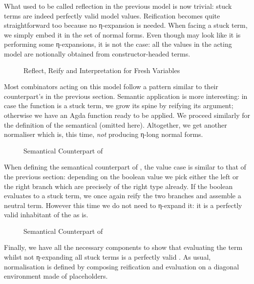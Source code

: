 What used to be called reflection in the previous model is now trivial:
stuck terms are indeed perfectly valid model values. Reification becomes
quite straightforward too because no η-expansion is needed. When facing
a stuck term, we simply embed it in the set of normal forms. Even though
 may look like it is performing some η-expansions, it is not
the case: all the values in the acting model are notionally obtained
from constructor-headed terms.

\begin{figure}[h]
\caption{Reflect, Reify and Interpretation for Fresh Variables}
\end{figure}

Most combinators acting on this model follow a pattern similar to their
counterpart's in the previous section. Semantic application is
more interesting: in case the function is a stuck term, we grow its
spine by reifying its argument; otherwise we have an Agda function ready
to be applied. We proceed similarly for the definition of the semantical
 (omitted here). Altogether, we get another
normaliser which is, this time, \emph{not} producing η-long normal forms.

\begin{figure}[h]
\caption{Semantical Counterpart of }
\end{figure}

When defining the semantical counterpart of , the value case is similar to
that of the previous section: depending on the boolean value we pick either the left
or the right branch which are precisely of the right type already. If the boolean
evaluates to a stuck term, we once again reify the two branches and assemble a neutral
term. However this time we do not need to η-expand it: it is a perfectly valid inhabitant
of the  as is.

\begin{figure}[h]
\caption{Semantical Counterpart of }
\end{figure}

Finally, we have all the necessary components to show that evaluating
the term whilst not η-expanding all stuck terms is a perfectly valid
. As usual, normalisation is defined by composing
reification and evaluation on a diagonal environment made of placeholders.

